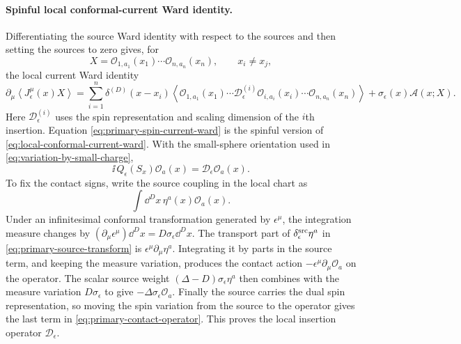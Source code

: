 \paragraph{Spinful local conformal-current Ward identity.}
Differentiating the source Ward identity with respect to the sources and then
setting the sources to zero gives, for
\[
  X=\mathcal O_{1,a_1}(x_1)\cdots\mathcal O_{n,a_n}(x_n),
  \qquad x_i\ne x_j ,
\]
the local current Ward identity
\begin{equation}
  \partial_\mu
  \left\langle J^\mu_\epsilon(x)X\right\rangle
  =
  \sum_{i=1}^n
  \delta^{(D)}(x-x_i)
  \left\langle
    \mathcal O_{1,a_1}(x_1)\cdots
    \mathcal D_\epsilon^{(i)}\mathcal O_{i,a_i}(x_i)\cdots
    \mathcal O_{n,a_n}(x_n)
  \right\rangle
  +
  \sigma_\epsilon(x)\mathcal A(x;X).
  \label{eq:primary-spin-current-ward}
\end{equation}
Here \(\mathcal D_\epsilon^{(i)}\) uses the spin representation and scaling
dimension of the \(i\)th insertion.  Equation
\eqref{eq:primary-spin-current-ward} is the spinful version of
\eqref{eq:local-conformal-current-ward}.  With the small-sphere orientation
used in \eqref{eq:variation-by-small-charge},
\begin{equation}
  \ii\,Q_\epsilon(S_x)\mathcal O_a(x)
  =
  \mathcal D_\epsilon\mathcal O_a(x).
  \label{eq:small-sphere-primary-action}
\end{equation}
To fix the contact signs, write the source coupling in the local chart as
\[
  \int \dd^D x\,\eta^a(x)\mathcal O_a(x).
\]
Under an infinitesimal conformal transformation generated by
\(\epsilon^\mu\), the integration measure changes by
\((\partial_\mu\epsilon^\mu)\dd^D x=D\sigma_\epsilon\dd^D x\).  The transport
part of \(\delta_\epsilon^{\rm src}\eta^a\) in
\eqref{eq:primary-source-transform} is
\(\epsilon^\mu\partial_\mu\eta^a\).  Integrating it by parts in the source
term, and keeping the measure variation, produces the contact action
\(-\epsilon^\mu\partial_\mu\mathcal O_a\) on the operator.  The scalar source
weight \((\Delta-D)\sigma_\epsilon\eta^a\) then combines with the measure
variation \(D\sigma_\epsilon\) to give
\(-\Delta\sigma_\epsilon\mathcal O_a\).  Finally the source carries the dual
spin representation, so moving the spin variation from the source to the
operator gives the last term in
\eqref{eq:primary-contact-operator}.  This proves the local insertion
operator \(\mathcal D_\epsilon\).

